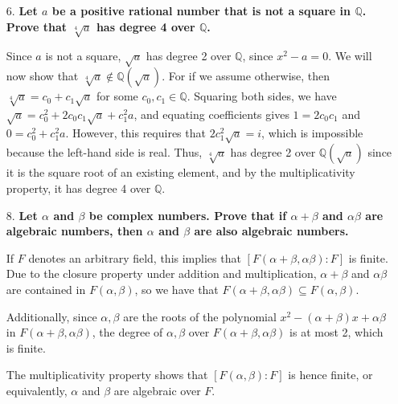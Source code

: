 \documentclass[a4paper,12pt]{article}
\begin{document}
\begin{enumerate}
    \item[6.]
        \boldmath
        \textbf{Let $a$ be a positive rational number that is not a square in $\mathbb{Q}$. Prove that $\sqrt[4]a$ has degree 4 over $\mathbb{Q}$.} \par
        \unboldmath
        Since $a$ is not a square, $\sqrt{a}$ has degree 2 over $\mathbb{Q}$, since $x^2 - a = 0$. We will now show that $\sqrt[4]{a} \notin \mathbb{Q}(\sqrt{a})$. For if we assume otherwise, then $\sqrt[4]{a} = c_0 + c_1 \sqrt{a}$ for some $c_0, c_1 \in \mathbb{Q}$. Squaring both sides, we have $\sqrt{a} = c_0^2 + 2c_0 c_1 \sqrt{a} + c_1^2 a$, and equating coefficients gives $1 = 2c_0c_1$ and $0 = c_0^2 + c_1^2 a$. However, this requires that $2c_1^2 \sqrt{a}= i$, which is impossible because the left-hand side is real. Thus, $\sqrt[4]{a}$ has degree 2 over $\mathbb{Q}(\sqrt{a})$ since it is the square root of an existing element, and by the multiplicativity property, it has degree 4 over $\mathbb{Q}$.

    \item[8.]
        \boldmath
        \textbf{Let $\alpha$ and $\beta$ be complex numbers. Prove that if $\alpha + \beta$ and $\alpha \beta$ are algebraic numbers, then $\alpha$ and $\beta$ are also algebraic numbers.} \par
        \unboldmath
        If $F$ denotes an arbitrary field, this implies that $[F(\alpha + \beta, \alpha \beta) : F]$ is finite. Due to the closure property under addition and multiplication, $\alpha + \beta$ and $\alpha \beta$ are contained in $F(\alpha, \beta)$, so we have that $F(\alpha + \beta, \alpha \beta) \subseteq F(\alpha, \beta)$. \par
        Additionally, since $\alpha, \beta$ are the roots of the polynomial $x^2 - (\alpha + \beta) x + \alpha \beta$ in $F(\alpha + \beta, \alpha \beta)$, the degree of $\alpha, \beta$ over $F(\alpha + \beta, \alpha \beta)$ is at most 2, which is finite. \par
        The multiplicativity property shows that $[F(\alpha, \beta) : F]$ is hence finite, or equivalently, $\alpha$ and $\beta$ are algebraic over $F$.


\end{enumerate}
\end{document}
